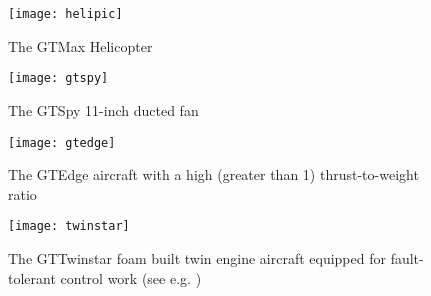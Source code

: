 \begin{figure}
  \centering\texttt{[image: helipic]}
  \caption{The GTMax Helicopter}
  \label{f:helipic}
\end{figure}
\begin{figure}
  \centering\texttt{[image: gtspy]}
  \caption{The GTSpy 11-inch ducted fan}
  \label{f:gtspypic}
\end{figure}

\begin{figure}
  \centering\texttt{[image: gtedge]}
  \caption{The GTEdge aircraft with a high (greater than 1) thrust-to-weight ratio}
  \label{f:gtedgepic}
\end{figure}

\begin{figure}
  \centering\texttt{[image: twinstar]}
  \caption{The GTTwinstar foam built twin engine aircraft equipped for fault-tolerant control work (see e.g. \cite{chowdhary:infotech11:2011})}
  \label{f:twinstarpic}
\end{figure}

